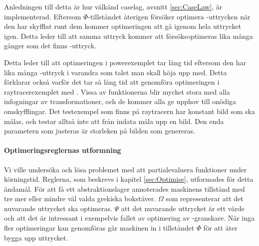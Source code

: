 \documentclass[Rapport]{subfiles}
\begin{document}
Anledningen till detta är hur välkänd caselag, avsnitt \ref{sec:CaseLaw}, är 
implementerad. Eftersom $\Phi$-tillståndet återigen försöker optimera -uttrycken
när den har skyfflat runt dem kommer optimeringen att gå igenom hela uttrycket igen.
Detta leder till att samma uttryck kommer att försöksoptimeras lika många gånger
som det finns -uttryck.  

Detta leder till att optimeringen i powerexemplet tar lång tid eftersom den har lika
många -uttryck i varandra som talet man skall höja upp med.
Detta förklarar också varför det tar så lång tid att genomföra optimeringen
i raytracerexemplet med . Vissa av funktionerna blir mycket stora med alla infogningar
av transformationer, och de kommer alla ge upphov till onödiga omskyfflingar.
Det testexempel som finns på raytracern har konstant bild som ska målas, och
testar alltså inte att från indata måla upp en bild. Den enda parametern som
justeras är storleken på bilden som genereras.



\paragraph{Optimeringsreglernas utformning}
Vi ville undersöka och lösa problemet med att partialevaluera funktioner
under körningstid. Reglerna, som beskrevs i kapitel \ref{sec:Optimise}, 
utformades för detta ändamål. För att få ett abstraktionslager annoterades
maskinens tillstånd med tre mer eller mindre väl valda grekiska bokstäver.
$\Omega$ som representerar att det nuvarande uttrycket ska optimeras.
$\Psi$ att det nuvarande uttrycket är ett värde och att det är intressant
i exempelvis fallet av optimering av -granskare.
När inga fler optimeringar kan genomföras går maskinen in i tillståndet $\Phi$ 
för att åter bygga upp uttrycket.
\end{document}
